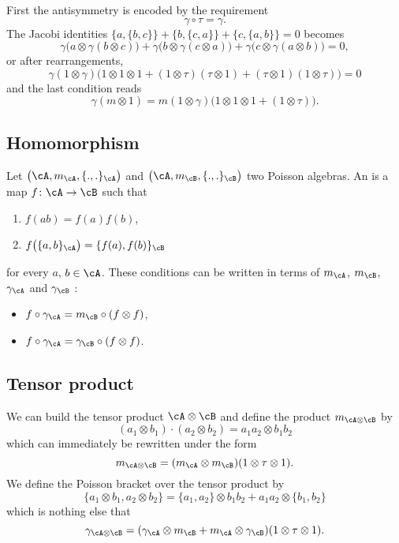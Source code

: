 First the antisymmetry is encoded by the requirement 
\begin{equation}
\gamma\circ\tau=\gamma.
\end{equation}
The Jacobi identities $\{ a,\{ b,c \} \}+\{ b,\{ c,a \} \}+\{ c,\{ a,b \} \}=0 $ becomes
\[ 
  \gamma\big( a\otimes \gamma(b\otimes c) \big)+\gamma\big( b\otimes\gamma(c\otimes a) \big)+\gamma\big( c\otimes\gamma(a\otimes b) \big)=0,
\]
or after rearrangements, 
\begin{equation}
\gamma(1\otimes\gamma)\big( 1\otimes 1\otimes 1+(1\otimes\tau)(\tau\otimes 1)+(\tau\otimes 1)(1\otimes\tau) \big)=0
\end{equation}
and the last condition reads
\begin{equation}
\gamma(m\otimes 1)=m(1\otimes\gamma)\big( 1\otimes 1\otimes 1+(1\otimes\tau) \big).
\end{equation}

\subsection{Homomorphism}

Let $\big( \cA,m_{\cA},\{.,.\}_{\cA} \big)$ and $\big( \cA,m_{\cB},\{.,.\}_{\cB} \big)$ two Poisson algebras. An  is a map $f\colon \cA\to \cB$ such that
\begin{enumerate}
\item $f(ab)=f(a)f(b)$,
\item $f\big( \{a,b\}_{\cA} \big)=\{f(a),f(b)\}_{\cB}$
\end{enumerate}
for every $a$, $b\in\cA$. These conditions can be written in terms of $m_{\cA}$, $m_{\cB}$, $\gamma_{\cA}$ and $\gamma_{\cB}$ :
\begin{itemize}
\item $f\circ \gamma_{\cA}=m_{\cB}\circ(f\otimes f)$,
\item $f\circ \gamma_{\cA}=\gamma_{\cB}\circ(f\otimes f)$.
\end{itemize}

\subsection{Tensor product}

We can build the tensor product $\cA\otimes\cB$ and define the product $m_{\cA\otimes\cB}$ by
\[
(a_1\otimes b_1)\cdot(a_2\otimes b_2)=a_1a_2\otimes b_1b_2
\]
which can immediately be rewritten under the form
\begin{equation}
m_{\cA\otimes\cB}=(m_{\cA}\otimes m_{\cB})(1\otimes\tau \otimes 1).
\end{equation}
We define the Poisson bracket over the tensor product by
\[ 
  \{ a_1\otimes b_1,a_2\otimes b_2 \}=\{ a_1,a_2 \}\otimes b_1b_2+a_1a_2\otimes\{ b_1,b_2 \}
\]
which is nothing else that
\begin{equation}
\gamma_{\cA\otimes \cB}=(\gamma_{\cA}\otimes m_{\cB}+m_{\cA}\otimes \gamma_{\cB})(1\otimes \tau\otimes 1).
\end{equation}

